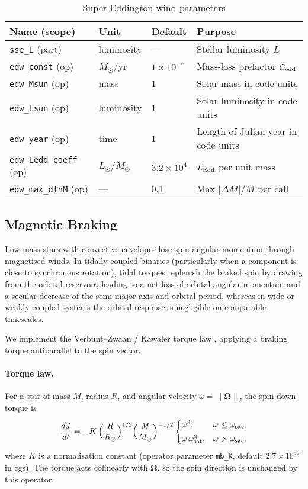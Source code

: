 \documentclass[11pt]{article}
\begin{document}
\begin{table}[h]
\centering\footnotesize
\caption{Super-Eddington wind parameters}
\label{tab:edw}
\begin{tabular}{@{}llll@{}}
\toprule
Name (scope) & Unit & Default & Purpose \\
\midrule
\texttt{sse\_L} (part) & luminosity & — & Stellar luminosity $L$\\
\texttt{edw\_const} (op) & $M_\odot$/yr & $1\times10^{-6}$ & Mass-loss prefactor $C_{\rm edd}$\\
\texttt{edw\_Msun}  (op) & mass & 1 & Solar mass in code units\\
\texttt{edw\_Lsun}  (op) & luminosity & 1 & Solar luminosity in code units\\
\texttt{edw\_year}  (op) & time & 1 & Length of Julian year in code units\\
\texttt{edw\_Ledd\_coeff} (op) & $L_\odot/M_\odot$ & $3.2\times10^{4}$ & $L_{\rm Edd}$ per unit mass\\
\texttt{edw\_max\_dlnM} (op) & — & 0.1 & Max $|\Delta M|/M$ per call\\
\bottomrule
\end{tabular}
\end{table}
\subsection{Magnetic Braking}
\label{sec:mb}

Low‑mass stars with convective envelopes lose spin angular momentum through
magnetised winds. In tidally coupled binaries (particularly when a component is close to synchronous rotation), tidal torques replenish the braked spin by drawing from the orbital reservoir, leading to a net loss of orbital angular momentum and a secular decrease of the semi‑major axis and orbital period, whereas in wide or weakly coupled systems the orbital response is negligible on comparable timescales.

We implement the Verbunt--Zwaan / Kawaler torque law
\citep{Verbunt1981,Kawaler1988}, applying a braking torque antiparallel to the
spin vector.

\paragraph{Torque law.}
For a star of mass $M$, radius $R$, and angular velocity
$\omega = \lVert\boldsymbol{\Omega}\rVert$, the spin‑down torque is
\begin{equation}
\label{eq:mb_torque}
\frac{dJ}{dt}
= -K\,\Big(\frac{R}{R_\odot}\Big)^{1/2}\Big(\frac{M}{M_\odot}\Big)^{-1/2}
\begin{cases}
\omega^3, & \omega \le \omega_{\rm sat},\\[3pt]
\omega\,\omega_{\rm sat}^{2}, & \omega > \omega_{\rm sat},
\end{cases}
\end{equation}
where $K$ is a normalisation constant (operator parameter \texttt{mb\_K},
default $2.7\times10^{47}$ in cgs). The torque acts colinearly with
$\boldsymbol{\Omega}$, so the spin direction is unchanged by this operator.
\end{document}
